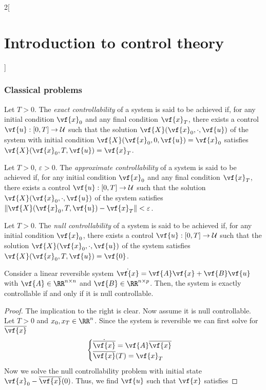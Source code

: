 \documentclass[../../../main_math.tex]{subfiles}
\begin{document}
\begin{multicols}{2}[\section{Introduction to control theory}]
  \subsubsection{Classical problems}
  \begin{definition}
    Let $T>0$. The \emph{exact controllability} of a system is said to be achieved if, for any initial condition $\vf{x}_0$ and any final condition $\vf{x}_T$, there exists a control $\vf{u}:[0,T]\to \mathcal{U}$ such that the solution $\vf{X}(\vf{x}_0, \cdot, \vf{u})$ of the system with initial condition $\vf{X}(\vf{x}_0, 0, \vf{u}) = \vf{x}_0$ satisfies $\vf{X}(\vf{x}_0, T, \vf{u}) = \vf{x}_T$.
  \end{definition}
  \begin{definition}
    Let $T>0$, $\varepsilon>0$. The \emph{approximate controllability} of a system is said to be achieved if, for any initial condition $\vf{x}_0$ and any final condition $\vf{x}_T$, there exists a control $\vf{u}:[0,T]\to \mathcal{U}$ such that the solution $\vf{X}(\vf{x}_0, \cdot, \vf{u})$ of the system satisfies $\norm{\vf{X}(\vf{x}_0, T, \vf{u}) - \vf{x}_T}<\varepsilon$.
  \end{definition}
  \begin{definition}
    Let $T>0$. The \emph{null controllability} of a system is said to be achieved if, for any initial condition $\vf{x}_0$, there exists a control $\vf{u}:[0,T]\to \mathcal{U}$ such that the solution $\vf{X}(\vf{x}_0, \cdot, \vf{u})$ of the system satisfies $\vf{X}(\vf{x}_0, T, \vf{u}) = \vf{0}$.
  \end{definition}
  \begin{lemma}
    Consider a linear reversible system $\dot{\vf{x}} = \vf{A}\vf{x} + \vf{B}\vf{u}$ with $\vf{A}\in \RR^{n\times n}$ and $\vf{B}\in \RR^{n\times p}$. Then, the system is exactly controllable if and only if it is null controllable.
  \end{lemma}
  \begin{proof}
    The implication to the right is clear. Now assume it is null controllable. Let $T>0$ and $x_0,x_T\in \RR^n$. Since the system is reversible we can first solve for $\overline{\vf{x}}$
    $$
      \begin{cases}
        \dot{\overline{\vf{x}}} = \vf{A}\overline{\vf{x}} \\
        \overline{\vf{x}}(T) = \vf{x}_T
      \end{cases}
    $$
    Now we solve the null controllability problem with initial state $\vf{x}_0-\overline{\vf{x}}(0)$. Thus, we find $\vf{u}$ such that $\vf{x}$ satisfies

\end{proof}
\end{multicols}
\end{document}
